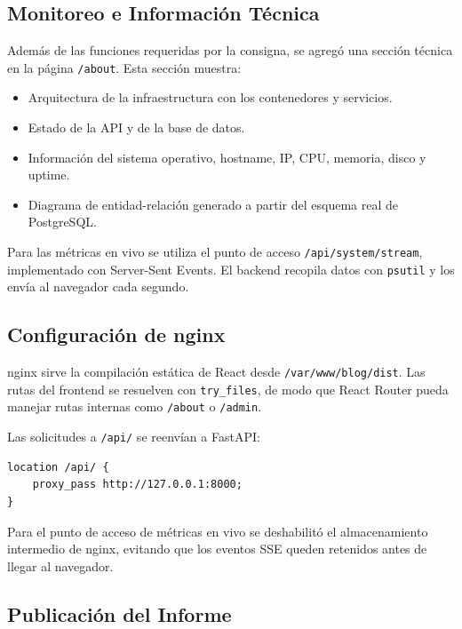 \documentclass[twoside, 11pt, a4paper]{article}
\begin{document}
    \subsection{Monitoreo e Información Técnica}

    Además de las funciones requeridas por la consigna, se agregó una sección técnica en la página \texttt{/about}. Esta sección muestra:

    \begin{itemize}
        \item Arquitectura de la infraestructura con los contenedores y servicios.
        \item Estado de la API y de la base de datos.
        \item Información del sistema operativo, hostname, IP, CPU, memoria, disco y uptime.
        \item Diagrama de entidad-relación generado a partir del esquema real de PostgreSQL.
    \end{itemize}

    Para las métricas en vivo se utiliza el punto de acceso \texttt{/api/system/stream}, implementado con Server-Sent Events. El backend recopila datos con \texttt{psutil} y los envía al navegador cada segundo.

    \subsection{Configuración de nginx}

    nginx sirve la compilación estática de React desde \texttt{/var/www/blog/dist}. Las rutas del frontend se resuelven con \texttt{try\_files}, de modo que React Router pueda manejar rutas internas como \texttt{/about} o \texttt{/admin}.

    Las solicitudes a \texttt{/api/} se reenvían a FastAPI:

    \begin{verbatim}
location /api/ {
    proxy_pass http://127.0.0.1:8000;
}
    \end{verbatim}

    Para el punto de acceso de métricas en vivo se deshabilitó el almacenamiento intermedio de nginx, evitando que los eventos SSE queden retenidos antes de llegar al navegador.

    \subsection{Publicación del Informe}
\end{document}
